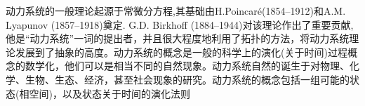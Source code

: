 \begin{introduction}
	动力系统的一般理论起源于常微分方程,其基础由H.Poincaré(1854–1912)和A.M. Lyapunov (1857–1918)奠定. G.D. Birkhoff (1884–1944)对该理论作出了重要贡献,他是“动力系统”一词的提出者，并且很大程度地利用了拓扑的方法，将动力系统理论发展到了抽象的高度。动力系统的概念是一般的科学上的演化(关于时间)过程概念的数学化，他们可以是相当不同的自然现象。动力系统自然的诞生于对物理、化学、生物、生态、经济，甚至社会现象的研究。动力系统的概念包括一组可能的状态(相空间)，以及状态关于时间的演化法则
	
\end{introduction}